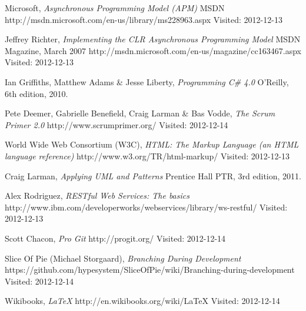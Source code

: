\begin{thebibliography}{99}

		Microsoft,
		\emph{Asynchronous Programming Model (APM)}\newline
		MSDN\newline
		http://msdn.microsoft.com/en-us/library/ms228963.aspx\newline
		Visited: 2012-12-13
	
		Jeffrey Richter,
		\emph{Implementing the CLR Asynchronous Programming Model}\newline
		MSDN Magazine,
		March 2007\newline
		http://msdn.microsoft.com/en-us/magazine/cc163467.aspx\newline
		Visited: 2012-12-13

		Ian Griffiths, Matthew Adams \& Jesse Liberty,
		\emph{Programming C\# 4.0}\newline
		O'Reilly, 6th edition, 2010.

		Pete Deemer, Gabrielle Benefield, Craig Larman \& Bas Vodde,
		\emph{The Scrum Primer 2.0}\newline
		http://www.scrumprimer.org/\newline
		Visited: 2012-12-14

		World Wide Web Consortium (W3C),
		\emph{HTML: The Markup Language (an HTML language reference)}\newline
		http://www.w3.org/TR/html-markup/\newline
		Visited: 2012-12-13
        
        Craig Larman,
        \emph{Applying UML and Patterns}\newline
        Prentice Hall PTR, 3rd edition, 2011.
        
        Alex Rodriguez,
        \emph{RESTful Web Services: The basics}\newline
        http://www.ibm.com/developerworks/webservices/library/ws-restful/\newline
        Visited: 2012-12-13
        
        Scott Chacon,
        \emph{Pro Git}\newline
        http://progit.org/\newline
        Visited: 2012-12-14
        
        Slice Of Pie (Michael Storgaard),
        \emph{Branching During Development}\newline
        https://github.com/hypesystem/SliceOfPie/wiki/Branching-during-development\newline
        Visited: 2012-12-14
        
        Wikibooks,
        \emph{\LaTeX}\newline
        http://en.wikibooks.org/wiki/LaTeX\newline
        Visited: 2012-12-14
\end{thebibliography}